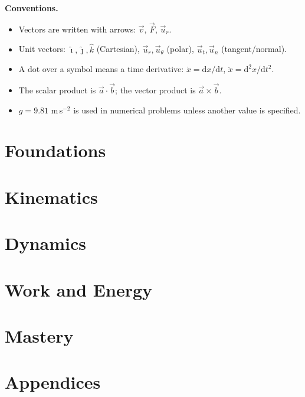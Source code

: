\documentclass[11pt,oneside,openany]{book}
\newcommand{\dd}{\mathrm{d}}
\newcommand{\ihat}{\hat{\imath}}
\newcommand{\jhat}{\hat{\jmath}}
\newcommand{\khat}{\hat{k}}
\newcommand{\ur}{\vec{u}_r}
\newcommand{\ut}{\vec{u}_\theta}
\newcommand{\un}{\vec{u}_n}
\newcommand{\utt}{\vec{u}_t}
\begin{document}
\textbf{Conventions.}
\begin{itemize}[leftmargin=1.4em,itemsep=2pt]
  \item Vectors are written with arrows: $\vec{v}$, $\vec{F}$, $\vec{u}_r$.
  \item Unit vectors: $\ihat,\jhat,\khat$ (Cartesian), $\ur,\ut$ (polar),
        $\utt,\un$ (tangent/normal).
  \item A dot over a symbol means a time derivative: $\dot{x}=\dd x/\dd t$,
        $\ddot{x}=\dd^2x/\dd t^2$.
  \item The scalar product is $\vec{a}\cdot\vec{b}$; the vector product is
        $\vec{a}\times\vec{b}$.
  \item $g=9.81$ m\,s$^{-2}$ is used in numerical problems unless another value
        is specified.
\end{itemize}

\tableofcontents

\mainmatter
\pagestyle{fancy}

\part{Foundations}




\part{Kinematics}







\part{Dynamics}






\part{Work and Energy}






\part{Mastery}



\appendix
\part*{Appendices}



\end{document}
